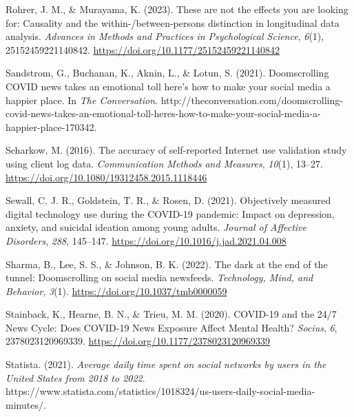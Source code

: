 \documentclass[
  man,mask,floatsintext]{apa7}
\newlength{\cslhangindent}
\newlength{\cslentryspacingunit} %
\newenvironment{CSLReferences}[2] %
 {%
  \setlength{\parindent}{0pt}
  \ifodd #1
  \let\oldpar\par
  \def\par{\hangindent=\cslhangindent\oldpar}
  \fi
  \setlength{\parskip}{#2\cslentryspacingunit}
 }%
 {}
\begin{document}
\begin{CSLReferences}{1}{0}
\leavevmode{}%
Rohrer, J. M., \& Murayama, K. (2023). These are not the effects you are looking for: {Causality} and the within-/between-persons distinction in longitudinal data analysis. \emph{Advances in Methods and Practices in Psychological Science}, \emph{6}(1), 25152459221140842. \url{https://doi.org/10.1177/25152459221140842}

\leavevmode{}%
Sandstrom, G., Buchanan, K., Aknin, L., \& Lotun, S. (2021). Doomscrolling {COVID} news takes an emotional toll \textendash{} here's how to make your social media a happier place. In \emph{The Conversation}. http://theconversation.com/doomscrolling-covid-news-takes-an-emotional-toll-heres-how-to-make-your-social-media-a-happier-place-170342.

\leavevmode{}%
Scharkow, M. (2016). The accuracy of self-reported {Internet} use validation study using client log data. \emph{Communication Methods and Measures}, \emph{10}(1), 13--27. \url{https://doi.org/10.1080/19312458.2015.1118446}

\leavevmode{}%
Sewall, C. J. R., Goldstein, T. R., \& Rosen, D. (2021). Objectively measured digital technology use during the {COVID-19} pandemic: {Impact} on depression, anxiety, and suicidal ideation among young adults. \emph{Journal of Affective Disorders}, \emph{288}, 145--147. \url{https://doi.org/10.1016/j.jad.2021.04.008}

\leavevmode{}%
Sharma, B., Lee, S. S., \& Johnson, B. K. (2022). The dark at the end of the tunnel: {Doomscrolling} on social media newsfeeds. \emph{Technology, Mind, and Behavior}, \emph{3}(1). \url{https://doi.org/10.1037/tmb0000059}

\leavevmode{}%
Stainback, K., Hearne, B. N., \& Trieu, M. M. (2020). {COVID-19} and the 24/7 {News Cycle}: {Does COVID-19 News Exposure Affect Mental Health}? \emph{Socius}, \emph{6}, 2378023120969339. \url{https://doi.org/10.1177/2378023120969339}

\leavevmode{}%
Statista. (2021). \emph{Average daily time spent on social networks by users in the {United States} from 2018 to 2022}. https://www.statista.com/statistics/1018324/us-users-daily-social-media-minutes/.


\end{CSLReferences}
\end{document}
